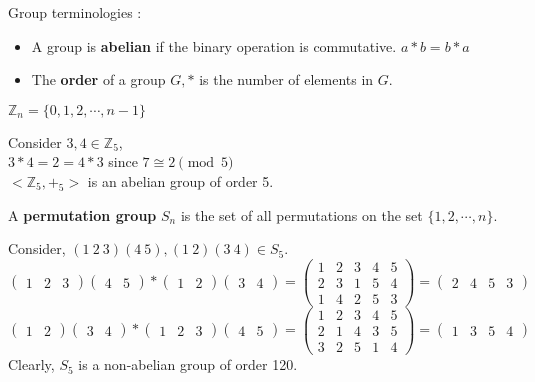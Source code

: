 \begin{definition}Group terminologies :
	\begin{itemize}
		\item A group is \textbf{abelian} if the binary operation is commutative. $a \ast b = b \ast a$ %
		\item The \textbf{order} of a group $G,\ast$ is the number of elements in $G$.%
	\end{itemize}
\end{definition}

\begin{definition}
	$\mathbb{Z}_n = \{ 0, 1, 2, \cdots, n-1 \}$
\end{definition}

\begin{remark}
	Consider $3,4 \in \mathbb{Z}_5$,\\
	$3 \ast 4 = 2 = 4 \ast 3$ since $7 \cong 2 \pmod 5$\\
	$<\!\mathbb{Z}_5,+_5\!>$ is an abelian group of order 5.
\end{remark}

\begin{definition}
	A \textbf{permutation group} $S_n$ is the set of all permutations on the set $\{1,2,\cdots,n\}$.	
\end{definition}

\begin{remark}
	Consider, $(1\ 2\ 3)(4\ 5), (1\ 2)(3\ 4) \in S_5$.
	$$\begin{pmatrix} 1 & 2 & 3 \end{pmatrix} \begin{pmatrix} 4 & 5 \end{pmatrix} \ast \begin{pmatrix} 1 & 2 \end{pmatrix} \begin{pmatrix} 3 & 4 \end{pmatrix} =  \begin{pmatrix} 1 & 2 & 3 & 4 & 5 \\ 2 & 3 & 1 & 5 & 4 \\ 1 & 4 & 2 & 5 & 3 \end{pmatrix}  = \begin{pmatrix} 2 & 4 & 5 & 3 \end{pmatrix} $$
	$$\begin{pmatrix} 1 & 2 \end{pmatrix} \begin{pmatrix} 3 & 4 \end{pmatrix} \ast \begin{pmatrix} 1 & 2 & 3\end{pmatrix} \begin{pmatrix} 4 & 5 \end{pmatrix} =  \begin{pmatrix} 1 & 2 & 3 & 4 & 5 \\ 2 & 1 & 4 & 3 & 5 \\ 3 & 2 & 5 & 1 & 4 \end{pmatrix}  = \begin{pmatrix} 1 & 3 & 5 & 4 \end{pmatrix} $$
	Clearly, $S_5$ is a non-abelian group of order 120.
\end{remark}


